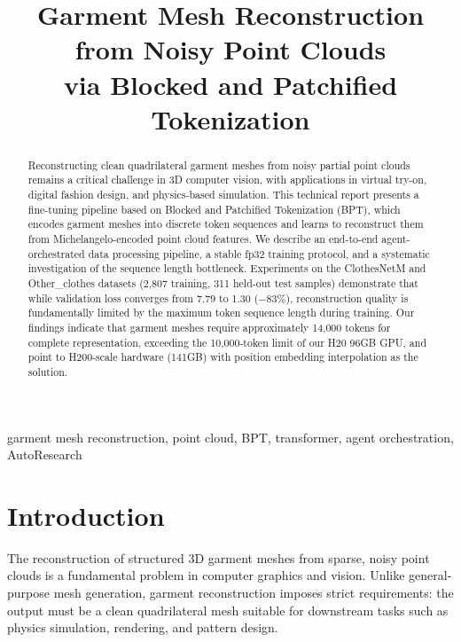 \documentclass[conference]{IEEEtran}
\begin{document}
\title{Garment Mesh Reconstruction from Noisy Point Clouds\\via Blocked and Patchified Tokenization}

\author{
}

\maketitle

\begin{abstract}
Reconstructing clean quadrilateral garment meshes from noisy partial point clouds remains a critical challenge in 3D computer vision, with applications in virtual try-on, digital fashion design, and physics-based simulation.
This technical report presents a fine-tuning pipeline based on Blocked and Patchified Tokenization (BPT), which encodes garment meshes into discrete token sequences and learns to reconstruct them from Michelangelo-encoded point cloud features.
We describe an end-to-end agent-orchestrated data processing pipeline, a stable fp32 training protocol, and a systematic investigation of the sequence length bottleneck.
Experiments on the ClothesNetM and Other\_clothes datasets (2,807 training, 311 held-out test samples) demonstrate that while validation loss converges from 7.79 to 1.30 ($-83\%$), reconstruction quality is fundamentally limited by the maximum token sequence length during training.
Our findings indicate that garment meshes require approximately 14,000 tokens for complete representation, exceeding the 10,000-token limit of our H20 96GB GPU, and point to H200-scale hardware (141GB) with position embedding interpolation as the solution.
\end{abstract}

\begin{IEEEkeywords}
garment mesh reconstruction, point cloud, BPT, transformer, agent orchestration, AutoResearch
\end{IEEEkeywords}

\section{Introduction}

The reconstruction of structured 3D garment meshes from sparse, noisy point clouds is a fundamental problem in computer graphics and vision.
Unlike general-purpose mesh generation, garment reconstruction imposes strict requirements: the output must be a clean quadrilateral mesh suitable for downstream tasks such as physics simulation, rendering, and pattern design.
\end{document}
